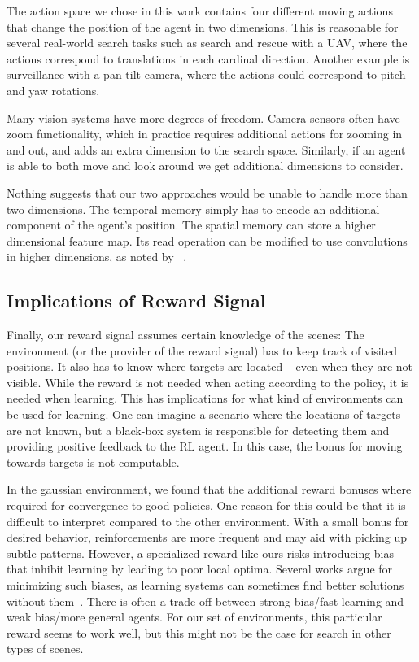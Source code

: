 The action space we chose in this work contains four different moving actions that change the position of the agent in two dimensions.
This is reasonable for several real-world search tasks such as search and rescue with a UAV, where the actions correspond to translations in each cardinal direction.
Another example is surveillance with a pan-tilt-camera, where the actions could correspond to pitch and yaw rotations.

Many vision systems have more degrees of freedom.
Camera sensors often have zoom functionality, which in practice requires additional actions for zooming in and out, and adds an extra dimension to the search space.
Similarly, if an agent is able to both move and look around we get additional dimensions to consider.

Nothing suggests that our two approaches would be unable to handle more than two dimensions.
The temporal memory simply has to encode an additional component of the agent's position.
The spatial memory can store a higher dimensional feature map.
Its read operation can be modified to use convolutions in higher dimensions, as noted by ~\cite{parisotto_neural_2017}.

\subsection{Implications of Reward Signal}

Finally, our reward signal assumes certain knowledge of the scenes:
The environment (or the provider of the reward signal) has to keep track of visited positions.
It also has to know where targets are located -- even when they are not visible.
While the reward is not needed when acting according to the policy, it is needed when learning.
This has implications for what kind of environments can be used for learning.
One can imagine a scenario where the locations of targets are not known, but a black-box system is responsible for detecting them and providing positive feedback to the RL agent.
In this case, the bonus for moving towards targets is not computable.

In the gaussian environment, we found that the additional reward bonuses where required for convergence to good policies.
One reason for this could be that it is difficult to interpret compared to the other environment.
With a small bonus for desired behavior, reinforcements are more frequent and may aid with picking up subtle patterns.
However, a specialized reward like ours risks introducing bias that inhibit learning by leading to poor local optima.
Several works argue for minimizing such biases, as learning systems can sometimes find better solutions without them~\cite{hessel_inductive_2019}.
There is often a trade-off between strong bias/fast learning and weak bias/more general agents.
For our set of environments, this particular reward seems to work well, but this might not be the case for search in other types of scenes.


